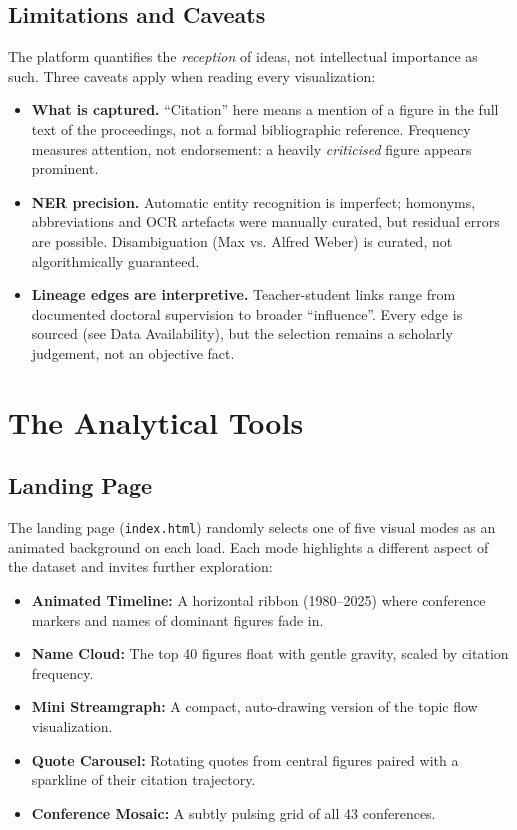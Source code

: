 \documentclass[11pt,a4paper,twoside]{article}
\begin{document}
\subsection{Limitations and Caveats}
The platform quantifies the \emph{reception} of ideas, not intellectual importance as such. Three caveats apply when reading every visualization:
\begin{itemize}[leftmargin=*,itemsep=2pt,topsep=2pt]
    \item \textbf{What is captured.} ``Citation'' here means a mention of a figure in the full text of the proceedings, not a formal bibliographic reference. Frequency measures attention, not endorsement: a heavily \emph{criticised} figure appears prominent.
    \item \textbf{NER precision.} Automatic entity recognition is imperfect; homonyms, abbreviations and OCR artefacts were manually curated, but residual errors are possible. Disambiguation (Max vs. Alfred Weber) is curated, not algorithmically guaranteed.
    \item \textbf{Lineage edges are interpretive.} Teacher-student links range from documented doctoral supervision to broader ``influence''. Every edge is sourced (see Data Availability), but the selection remains a scholarly judgement, not an objective fact.
\end{itemize}

\section{The Analytical Tools}

\subsection{Landing Page}
The landing page (\texttt{index.html}) randomly selects one of five visual modes as an animated background on each load. Each mode highlights a different aspect of the dataset and invites further exploration:
\begin{itemize}[leftmargin=*,itemsep=2pt,topsep=2pt]
    \item \textbf{Animated Timeline:} A horizontal ribbon (1980--2025) where conference markers and names of dominant figures fade in.
    \item \textbf{Name Cloud:} The top 40 figures float with gentle gravity, scaled by citation frequency.
    \item \textbf{Mini Streamgraph:} A compact, auto-drawing version of the topic flow visualization.
    \item \textbf{Quote Carousel:} Rotating quotes from central figures paired with a sparkline of their citation trajectory.
    \item \textbf{Conference Mosaic:} A subtly pulsing grid of all 43 conferences.
\end{itemize}
\end{document}
